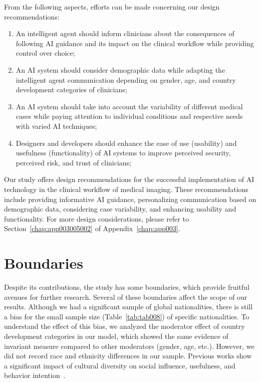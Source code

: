 \noindent
From the following aspects, efforts can be made concerning our design recommendations:

\vspace{0.50mm}

\begin{enumerate}
\item An intelligent agent should inform clinicians about the consequences of following \ac{AI} guidance and its impact on the clinical workflow while providing control over choice;
\item An \ac{AI} system should consider demographic data while adapting the intelligent agent communication depending on gender, age, and country development categories of clinicians;
\item An \ac{AI} system should take into account the variability of different medical cases while paying attention to individual conditions and respective needs with varied \ac{AI} techniques;
\item Designers and developers should enhance the ease of use (usability) and usefulness (functionality) of \ac{AI} systems to improve perceived security, perceived risk, and trust of clinicians;
\end{enumerate}

Our study offers design recommendations for the successful implementation of \ac{AI} technology in the clinical workflow of medical imaging.
These recommendations include providing informative \ac{AI} guidance, personalizing communication based on demographic data, considering case variability, and enhancing usability and functionality.
For more design considerations, please refer to Section~\ref{chap:app003005002} of Appendix~\ref{chap:app003}.

\section{Boundaries}
\label{sec:chap004007}

Despite its contributions, the study has some boundaries, which provide fruitful avenues for further research.
Several of these boundaries affect the scope of our results.
Although we had a significant sample of global nationalities, there is still a bias for the small sample size (Table~\ref{tab:tab008}) of specific nationalities.
To understand the effect of this bias, we analyzed the moderator effect of country development categories in our model, which showed the same evidence of invariant measure compared to other moderators (gender, age, etc.).
However, we did not record race and ethnicity differences in our sample.
Previous works show a significant impact of cultural diversity on social influence, usefulness, and behavior intention~\cite{Belanche2019, info:doi/10.2196/27122}.

